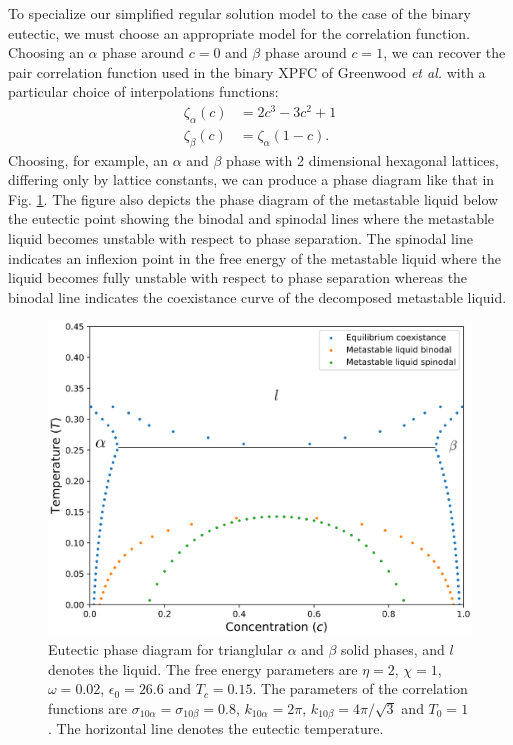 \documentclass[showkeys, prb, reprint]{revtex4-1}
\begin{document}
To specialize our simplified regular solution model to the case of the binary eutectic, we must choose an appropriate model for the correlation function. Choosing an $\alpha$ phase around $c = 0$ and $\beta$ phase around $c = 1$, we can recover the pair correlation function used in the binary XPFC of Greenwood \textit{et al.} with a particular choice of interpolations functions: 
%
\begin{align}
   \zeta_\alpha(c) &= 2c^3 - 3c^2 + 1 \\
   \zeta_\beta(c) &= \zeta_\alpha(1 - c).
\end{align}
%
Choosing, for example, an $\alpha$ and $\beta$ phase with 2 dimensional
hexagonal lattices, differing only by lattice constants, we can produce a phase
diagram like that in Fig. \ref{eutectic}. The figure  also depicts the
phase diagram of the metastable liquid below the eutectic point showing the
binodal and spinodal lines where the metastable liquid becomes unstable with
respect to phase separation. The spinodal line indicates an inflexion point in
the free energy of the metastable liquid where the liquid becomes fully
unstable with respect to phase separation whereas the binodal line indicates
the coexistance curve of the decomposed metastable liquid.
\begin{figure}[h]
    \includegraphics[scale=0.45]{eutectic}
    \caption[Eutectic Phase Diagram]{
        \label{eutectic} Eutectic phase diagram for trianglular $\alpha$ and
        $\beta$ solid phases, and $l$ denotes the liquid. The free energy
        parameters are $\eta = 2$, $\chi = 1$, $\omega=0.02$, $\epsilon_0 =
        26.6$ and $T_c = 0.15$. The parameters of the correlation  functions are
        $\sigma_{10\alpha} = \sigma_{10\beta} = 0.8$, $k_{10\alpha} = 2\pi$,
        $k_{10\beta} = 4\pi/\sqrt{3}$ and $T_0 = 1$. The horizontal line
        denotes the eutectic temperature.
    }
\end{figure}
\end{document}
